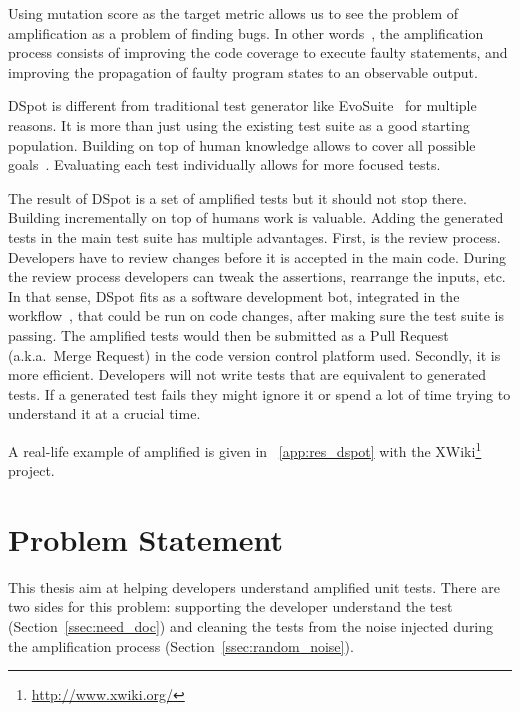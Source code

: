 \documentclass[a4paper,11pt]{sdm_internship}
\newcommand{\dspot}{DSpot\xspace}
\theoremstyle{definition}
\begin{document}
Using mutation score as the target metric allows us to see the problem of amplification as a problem of finding bugs.
In other words~\cite{shamshiri2015automatically}, the amplification process consists of improving the code coverage to execute faulty statements, and improving the propagation of faulty program states to an observable output.

\dspot{} is different from traditional test generator like EvoSuite~\cite{fraser2011evosuite} for multiple reasons.
It is more than just using the existing test suite as a good starting population.
Building on top of human knowledge allows to cover all possible goals~\cite{rojas2017detailed}.
Evaluating each test individually allows for more focused tests.

The result of \dspot{} is a set of amplified tests but it should not stop there.
Building incrementally on top of humans work is valuable.
Adding the generated tests in the main test suite has multiple advantages.
First, is the review process.
Developers have to review changes before it is accepted in the main code.
During the review process developers can tweak the assertions, rearrange the inputs, etc.
In that sense, \dspot{} fits as a software development bot, integrated in the workflow~\cite{urli2018design}, that could be run on code changes, after making sure the test suite is passing.
The amplified tests would then be submitted as a Pull Request (a.k.a.\ Merge Request) in the code version control platform used.
Secondly, it is more efficient.
Developers will not write tests that are equivalent to generated tests.
If a generated test fails they might ignore it or spend a lot of time trying to understand it at a crucial time.

A real-life example of amplified is given in \appendixname~\ref{app:res_dspot} with the XWiki\footnote{\url{http://www.xwiki.org/}} project.


\section{Problem Statement}%
\label{sec:problem_statement}
This thesis aim at helping developers understand amplified unit tests.
There are two sides for this problem: supporting the developer understand the test (Section~\ref{ssec:need_doc}) and cleaning the tests from the noise injected during the amplification process (Section~\ref{ssec:random_noise}).

\end{document}
